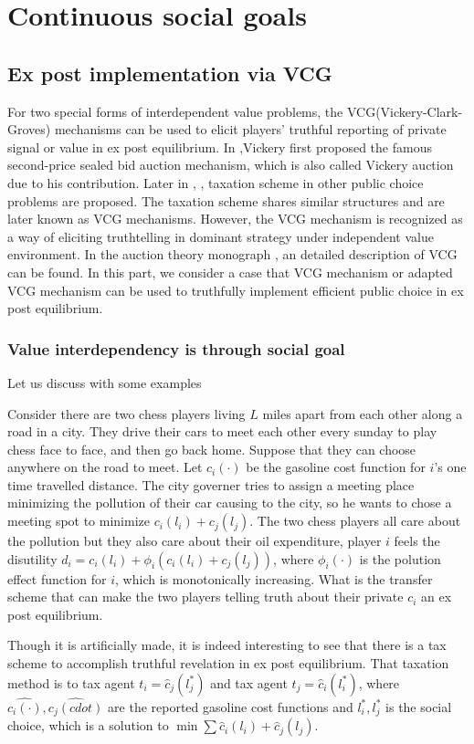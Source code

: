 \section{Continuous social goals}

\subsection{Ex post implementation via VCG}

For two special forms of interdependent value problems, the VCG(Vickery-Clark-Groves) mechanisms can be used to elicit players' truthful reporting of private signal or value in ex post equilibrium. In \parencite{Vickery61},Vickery first proposed the famous second-price sealed bid auction mechanism, which is also called Vickery auction due to his contribution. Later in \parencite{Clark71}, \parencite{Groves73}, taxation scheme in other public choice problems are proposed. The taxation scheme shares similar structures and are later known as VCG mechanisms. However, the VCG mechanism is recognized as a way of eliciting truthtelling in dominant strategy under independent value environment. In the auction theory monograph \parencite{Kris10}, an detailed description of VCG can be found.  In this part, we consider a case that VCG mechanism or adapted VCG mechanism can be used to truthfully implement efficient public choice in ex post equilibrium.

\subsubsection{Value interdependency is through social goal}

Let us discuss with some examples
\begin{example}
 Consider there are two chess players living $L$ miles apart from each other along a road in a city. They drive their cars to meet
 each other every sunday to play chess face to face, and then go back home. Suppose that they can choose anywhere on the road to meet. Let
 $c_i(\cdot)$ be the gasoline cost function for $i$'s one time travelled distance. 
The city governer tries to assign a meeting place minimizing the pollution of their car causing to the city, so he wants to
chose a meeting spot to minimize $c_i(l_i)+c_j(l_j)$. The two chess players all care about the 
pollution but they also care about their oil expenditure, player $i$ feels the disutility $d_i= c_i(l_i)+ \phi_i(c_i(l_i)+c_j(l_j))$, where $\phi_i(\cdot)$ is the polution effect function for $i$, which is monotonically increasing. What
 is the transfer scheme that can make the two players telling truth about their private $c_i$ an ex post equilibrium.
\end{example}
Though it is artificially made, it is indeed interesting to see that there is a tax scheme to accomplish truthful revelation in ex post equilibrium.
That taxation method is to tax agent $t_i= \hat{c}_j(l_j^*)$ and tax agent $t_j=\hat{c}_i(l_i^*)$, where $\hat{c_i(\cdot)},\hat{c_j(cdot)}$ are the reported gasoline cost functions and $l_i^*,l_j^*$ is the social choice, which is a solution to $\min\sum \hat{c}_i(l_i)+\hat{c}_j(l_j)$.

